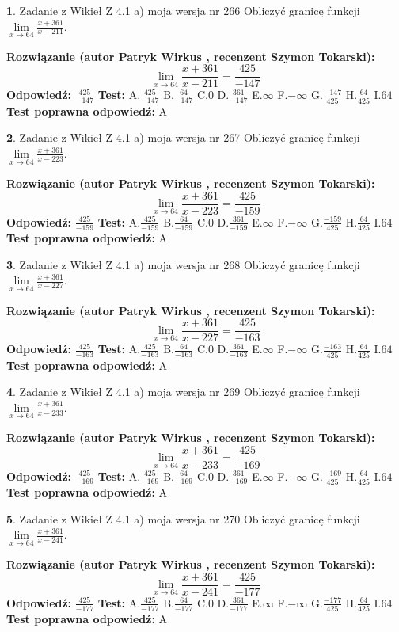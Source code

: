 \documentclass[12pt, a4paper]{article}
\theoremstyle{definition} %
\newtheorem{zad}{}
\newcommand{\zadStart}[1]{\begin{zad}#1\newline}
\newcommand{\zadStop}{\end{zad}}
\newcommand{\rozwStart}[2]{\noindent \textbf{Rozwiązanie (autor #1 , recenzent #2): }\newline}
\newcommand{\rozwStop}{\newline}
\newcommand{\odpStart}{\noindent \textbf{Odpowiedź:}\newline}
\newcommand{\odpStop}{\newline}
\newcommand{\testStart}{\noindent \textbf{Test:}\newline}
\newcommand{\testStop}{\newline}
\newcommand{\kluczStart}{\noindent \textbf{Test poprawna odpowiedź:}\newline}
\newcommand{\kluczStop}{\newline}
\begin{document}
\zadStart{Zadanie z Wikieł Z 4.1 a) moja wersja nr 266}
Obliczyć granicę funkcji $\lim\limits_{x\to64}\frac{x+361}{x-211}$.
\zadStop
\rozwStart{Patryk Wirkus}{Szymon Tokarski}
$$\lim\limits_{x\to64}\frac{x+361}{x-211} = \frac{425}{-147}$$
\rozwStop
\odpStart
$\frac{425}{-147}$
\odpStop
\testStart
A.$\frac{425}{-147}$
B.$\frac{64}{-147}$
C.$0$
D.$\frac{361}{-147}$
E.$\infty$
F.$-\infty$
G.$\frac{-147}{425}$
H.$\frac{64}{425}$
I.$64$
\testStop
\kluczStart
A
\kluczStop



\zadStart{Zadanie z Wikieł Z 4.1 a) moja wersja nr 267}
Obliczyć granicę funkcji $\lim\limits_{x\to64}\frac{x+361}{x-223}$.
\zadStop
\rozwStart{Patryk Wirkus}{Szymon Tokarski}
$$\lim\limits_{x\to64}\frac{x+361}{x-223} = \frac{425}{-159}$$
\rozwStop
\odpStart
$\frac{425}{-159}$
\odpStop
\testStart
A.$\frac{425}{-159}$
B.$\frac{64}{-159}$
C.$0$
D.$\frac{361}{-159}$
E.$\infty$
F.$-\infty$
G.$\frac{-159}{425}$
H.$\frac{64}{425}$
I.$64$
\testStop
\kluczStart
A
\kluczStop



\zadStart{Zadanie z Wikieł Z 4.1 a) moja wersja nr 268}
Obliczyć granicę funkcji $\lim\limits_{x\to64}\frac{x+361}{x-227}$.
\zadStop
\rozwStart{Patryk Wirkus}{Szymon Tokarski}
$$\lim\limits_{x\to64}\frac{x+361}{x-227} = \frac{425}{-163}$$
\rozwStop
\odpStart
$\frac{425}{-163}$
\odpStop
\testStart
A.$\frac{425}{-163}$
B.$\frac{64}{-163}$
C.$0$
D.$\frac{361}{-163}$
E.$\infty$
F.$-\infty$
G.$\frac{-163}{425}$
H.$\frac{64}{425}$
I.$64$
\testStop
\kluczStart
A
\kluczStop



\zadStart{Zadanie z Wikieł Z 4.1 a) moja wersja nr 269}
Obliczyć granicę funkcji $\lim\limits_{x\to64}\frac{x+361}{x-233}$.
\zadStop
\rozwStart{Patryk Wirkus}{Szymon Tokarski}
$$\lim\limits_{x\to64}\frac{x+361}{x-233} = \frac{425}{-169}$$
\rozwStop
\odpStart
$\frac{425}{-169}$
\odpStop
\testStart
A.$\frac{425}{-169}$
B.$\frac{64}{-169}$
C.$0$
D.$\frac{361}{-169}$
E.$\infty$
F.$-\infty$
G.$\frac{-169}{425}$
H.$\frac{64}{425}$
I.$64$
\testStop
\kluczStart
A
\kluczStop



\zadStart{Zadanie z Wikieł Z 4.1 a) moja wersja nr 270}
Obliczyć granicę funkcji $\lim\limits_{x\to64}\frac{x+361}{x-241}$.
\zadStop
\rozwStart{Patryk Wirkus}{Szymon Tokarski}
$$\lim\limits_{x\to64}\frac{x+361}{x-241} = \frac{425}{-177}$$
\rozwStop
\odpStart
$\frac{425}{-177}$
\odpStop
\testStart
A.$\frac{425}{-177}$
B.$\frac{64}{-177}$
C.$0$
D.$\frac{361}{-177}$
E.$\infty$
F.$-\infty$
G.$\frac{-177}{425}$
H.$\frac{64}{425}$
I.$64$
\testStop
\kluczStart
A
\kluczStop
\end{document}
